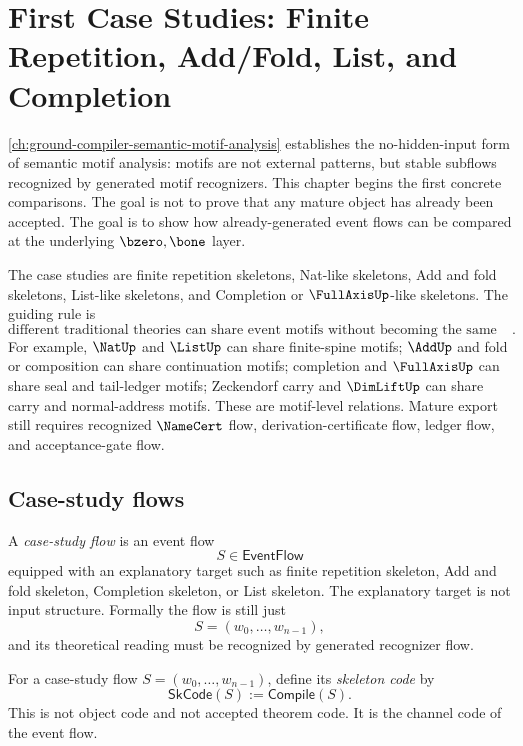 \chapter{First Case Studies: Finite Repetition, Add/Fold, List, and Completion}
\label{ch:ground-compiler-first-case-studies}

\autoref{ch:ground-compiler-semantic-motif-analysis} establishes the no-hidden-input form of semantic motif analysis: motifs are not external patterns, but stable subflows recognized by generated motif recognizers. This chapter begins the first concrete comparisons. The goal is not to prove that any mature object has already been accepted. The goal is to show how already-generated event flows can be compared at the underlying $\bzero,\bone$ layer.

The case studies are finite repetition skeletons, Nat-like skeletons, Add and fold skeletons, List-like skeletons, and Completion or $\FullAxisUp$-like skeletons. The guiding rule is
$$
  \boxed{\text{different traditional theories can share event motifs without becoming the same object}.}
$$
For example, $\NatUp$ and $\ListUp$ can share finite-spine motifs; $\AddUp$ and fold or composition can share continuation motifs; completion and $\FullAxisUp$ can share seal and tail-ledger motifs; Zeckendorf carry and $\DimLiftUp$ can share carry and normal-address motifs. These are motif-level relations. Mature export still requires recognized $\NameCert$ flow, derivation-certificate flow, ledger flow, and acceptance-gate flow.

\section{Case-study flows}
\label{sec:case-studies-flows}

\begin{definition}
\label{def:case-studies-flow}
A \emph{case-study flow} is an event flow
$$
  S\in\mathsf{EventFlow}
$$
equipped with an explanatory target such as finite repetition skeleton, Add and fold skeleton, Completion skeleton, or List skeleton. The explanatory target is not input structure. Formally the flow is still just
$$
  S=(w_0,\ldots,w_{n-1}),
$$
and its theoretical reading must be recognized by generated recognizer flow.
\end{definition}

\begin{definition}
\label{def:case-studies-skeleton-code}
For a case-study flow $S=(w_0,\ldots,w_{n-1})$, define its \emph{skeleton code} by
$$
  \mathsf{SkCode}(S):=\mathsf{Compile}(S).
$$
This is not object code and not accepted theorem code. It is the channel code of the event flow.
\end{definition}

